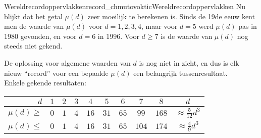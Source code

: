 \begin{surferIntroPage}{Wereldrecordoppervlakken}{record_chmutovoktic}{Wereldrecordoppervlakken}
    Nu blijkt dat het getal $\mu(d)$ zeer moeilijk te berekenen is.
    Sinds de 19de eeuw kent men de waarde van $\mu(d)$ voor $d=1,2,3,4$, maar voor $d=5$ werd $\mu(d)$ pas in 1980 gevonden, en voor $d=6$ in 1996.
    Voor $d\geqslant 7$ is de waarde van $\mu(d)$ nog steeds niet gekend.
  
    De oplossing voor algemene waarden van $d$ is nog niet in zicht, en dus is elk nieuw ``record'' voor een bepaalde $\mu(d)$ een belangrijk tussenresultaat.\\  Enkele gekende resultaten:
    
   \begin{center}
      \begin{tabular}{r|cccccccc|c}
        $d$ & $1$ & $2$ & $3$ & $4$ & $5$ & $6$ & $7$ & $8$ & $d$\\
        \hline
        \hline
        \rule{0pt}{1.2em}$\mu(d)\geqslant$ & $0$ & $1$ & $4$ & $16$ & $31$ & $65$ &
        $99$ & $168$ & 
        $\approx \frac{5}{12}d^3$\\[0.3em]
        \hline
        \rule{0pt}{1.2em}$\mu(d)\leqslant$ & $0$ & $1$ & $4$ & $16$ & $31$ & $65$ &
        $104$ & $174$ & $\approx \frac{4}{9}d^3$
      \end{tabular}
    \end{center}
\end{surferIntroPage}

